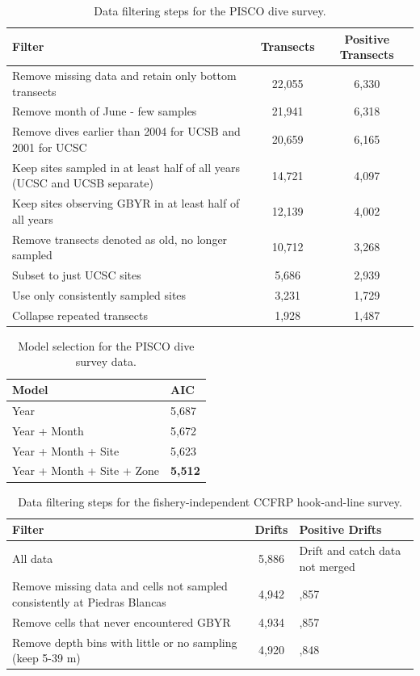 \documentclass[12pt,]{article}
\begin{document}
\begin{table}[ht]
\centering
\caption{Data filtering steps for the PISCO dive survey.} 
\label{tab:Fleet8_Filter}
\begin{tabular}{>{\raggedright}p{4in}cc}
  \hline
Filter & Transects & Positive Transects \\ 
  \hline
Remove missing data and retain only bottom transects & 22,055 & 6,330 \\ 
  Remove month of  June - few samples & 21,941 & 6,318 \\ 
  Remove dives earlier than 2004 for UCSB and 2001 for UCSC & 20,659 & 6,165 \\ 
  Keep sites sampled in at least half of all years (UCSC and UCSB separate) & 14,721 & 4,097 \\ 
  Keep sites observing GBYR in at least half of all years & 12,139 & 4,002 \\ 
  Remove transects denoted as old, no longer sampled & 10,712 & 3,268 \\ 
  Subset to just UCSC sites & 5,686 & 2,939 \\ 
  Use only consistently sampled sites & 3,231 & 1,729 \\ 
  Collapse repeated transects & 1,928 & 1,487 \\ 
   \hline
\end{tabular}
\end{table}

\vspace{3cm}

\begin{table}[ht]
\centering
\caption{Model selection for the PISCO dive survey data.} 
\label{tab:Fleet8_AIC}
\begin{tabular}{ll}
  \hline
Model & AIC \\ 
  \hline
Year & 5,687 \\ 
  Year + Month & 5,672 \\ 
  Year + Month + Site & 5,623 \\ 
  Year + Month + Site + Zone & \textbf{5,512} \\ 
   \hline
\end{tabular}
\end{table}

\clearpage
\newpage

\begin{table}[ht]
\centering
\caption{Data filtering steps for the fishery-independent CCFRP hook-and-line survey.} 
\label{tab:Fleet9_Filter}
\begin{tabular}{>{\raggedright}p{3.5in}c>{\centering}p{1.4in}}
  \hline
Filter & Drifts & Positive Drifts \\ 
  \hline
All data & 5,886 & Drift and catch data not merged \\ 
  Remove missing data and cells not sampled consistently at Piedras Blancas & 4,942 & 3,857 \\ 
  Remove cells that never encountered GBYR & 4,934 & 3,857 \\ 
  Remove depth bins with little or no sampling (keep 5-39 m) & 4,920 & 3,848 \\ 
   \hline
\end{tabular}
\end{table}
\end{document}
